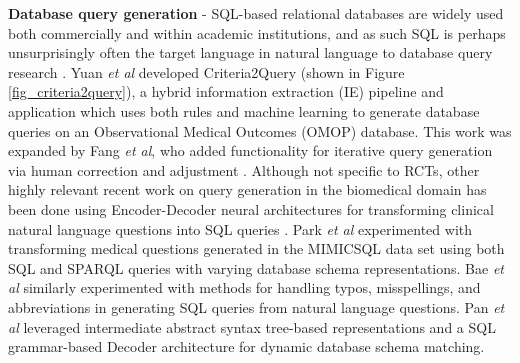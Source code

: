 \documentclass[../main.tex]{subfiles}
\begin{document}
\textbf{Database query generation} - SQL-based relational databases are widely used both commercially and within academic institutions, and as such SQL is perhaps unsurprisingly often the target language in natural language to database query research \cite{dar2019frameworks}. Yuan \textit{et al} developed Criteria2Query (shown in Figure \ref{fig_criteria2query}), a hybrid information extraction (IE) pipeline and application which uses both rules and machine learning to generate database queries on an Observational Medical Outcomes (OMOP) \cite{hripcsak2015observational} database. This work was expanded by Fang \textit{et al}, who added functionality for iterative query generation via human correction and adjustment \cite{fang2022combining}. Although not specific to RCTs, other highly relevant recent work on query generation in the biomedical domain has been done using Encoder-Decoder neural architectures for transforming clinical natural language questions into SQL queries \cite{bae2021question, park2021knowledge, wang2020text, pan2021bert, dhayne2021emr2vec}. Park \textit{et al} \cite{park2021knowledge} experimented with transforming medical questions generated in the MIMICSQL data set \cite{johnson2016mimic, wang2020text} using both SQL and SPARQL queries with varying database schema representations. Bae \textit{et al} similarly experimented with methods for handling typos, misspellings, and abbreviations in generating SQL queries from natural language questions. Pan \textit{et al} \cite{pan2021bert} leveraged intermediate abstract syntax tree-based representations and a SQL grammar-based Decoder architecture for dynamic database schema matching. 
\end{document}

